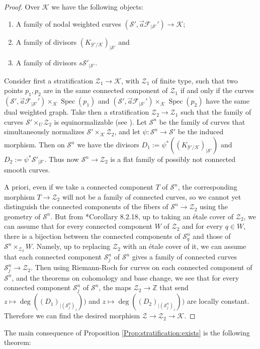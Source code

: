 \documentclass[11pt]{amsart}
\newcommand{\sF}{\mathscr{F}}
\newcommand{\sS}{\mathscr{S}}
\newcommand{\sZ}{\mathscr{Z}}
\newcommand{\spec}{\operatorname{Spec}}
\newcommand{\Kg}{\mathcal{K}}
\newcommand{\sY}{\mathscr{Y}}
\theoremstyle{definition}
\begin{document}
\begin{proof}
Over $\Kg$ we have the following objects:
\begin{enumerate}
 \item A family of nodal weighted curves $(\sS',\vec{a}\sF_{|\sS'}') \to \Kg$;
 \item A family of divisors $(K_{\sY'/\Kg})_{|\sS'}$ and
 \item A family of divisors $s\sS'_{|\sS'}$.
\end{enumerate}
Consider first a stratification $\sZ_1 \to \Kg$, with $\sZ_1$ of finite type, such that two points $p_1,p_2$ are in
the same connected component of $\sZ_1$ if and only if the curves $(\sS',\vec{a}\sF_{|\sS'}')\times_{\Kg}\spec(p_1)$ and $(\sS',\vec{a}\sF_{|\sS'}') \times_{\Kg}
\spec(p_2)$ have the same dual weighted graph. Take then a stratification $\sZ_2 \to \sZ_1$ such that the family of
curves $\sS'\times_U \sZ_2$ is equinormalizable (see \cite{Kollarequinorm}). Let $\sS^n$ be the family of curves that
simultaneously normalizes $\sS'\times_{\Kg} \sZ_2$, and let $\psi: \sS^n \to \sS'$ be the induced morphism. Then on
$\sS^n$ we have the divisors $D_1:=\psi^*((K_{\sY'/\Kg})_{|\sS'})$ and $D_2:=\psi^*\sS'_{|\sS'}$. Thus now $\sS^n\to \sZ_2$ is a flat family of
possibly not connected smooth curves.

A priori, even if we take a connected component $T$ of $\sS^n$, the corresponding morphism $T \to
\sZ_2$ will not be a family of connected curves, so we cannot yet distinguish the connected components of the fibers of $\sS^n \to \sZ_2$ using the
geometry of $\sS^n$. But from \cite{FGA}*{Corollary 8.2.18},
up to taking an étale cover of $\sZ_2$, we can assume that for every
connected component $W$ of $\sZ_2$ and
 for every
$q \in W$, there is a bijection between the connected components of $\sS^n_q$ and those of $\sS^n \times_{\sZ_2} W$.
Namely, up to replacing $\sZ_2$ with an étale cover of it, we can assume that each connected component $\sS_j^n$ of $\sS^n$ gives
a family of connected curves $\sS^n_j \to \sZ_2$. Then
using Riemann-Roch for curves on each connected component of $\sS^n$, and the theorems on cohomology and base change,
we see that for every connected component $\sS^n_j$ of $\sS^n$,
the maps $\sZ_2 \to \mathbb{Z}$ that send $z \mapsto \deg((D_1)_{|(\sS^n_j)_z}))$ and $z \mapsto \deg((D_2)_{|(\sS^n_j)_z}))$
are locally constant. 
Therefore we can find the desired morphism $\sZ \to \sZ_2 \to \Kg$.
\end{proof}
The main consequence of Proposition \ref{Prop:stratification:exists} is the following theorem:
\end{document}
